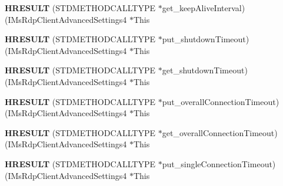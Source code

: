 \begin{DoxyCompactItemize}
\item 
\mbox{\label{struct_i_ms_rdp_client_advanced_settings4_vtbl_a57f37bf6c902b632d2842cdca290e2e7}} 
{\bfseries H\+R\+E\+S\+U\+LT} (S\+T\+D\+M\+E\+T\+H\+O\+D\+C\+A\+L\+L\+T\+Y\+PE $\ast$get\+\_\+keep\+Alive\+Interval)(I\+Ms\+Rdp\+Client\+Advanced\+Settings4 $\ast$This
\item 
\mbox{\label{struct_i_ms_rdp_client_advanced_settings4_vtbl_ae3d28b75d0776d9c0afe55852380e42c}} 
{\bfseries H\+R\+E\+S\+U\+LT} (S\+T\+D\+M\+E\+T\+H\+O\+D\+C\+A\+L\+L\+T\+Y\+PE $\ast$put\+\_\+shutdown\+Timeout)(I\+Ms\+Rdp\+Client\+Advanced\+Settings4 $\ast$This
\item 
\mbox{\label{struct_i_ms_rdp_client_advanced_settings4_vtbl_a1c4b92a5d56e238656e94f7db2dd317e}} 
{\bfseries H\+R\+E\+S\+U\+LT} (S\+T\+D\+M\+E\+T\+H\+O\+D\+C\+A\+L\+L\+T\+Y\+PE $\ast$get\+\_\+shutdown\+Timeout)(I\+Ms\+Rdp\+Client\+Advanced\+Settings4 $\ast$This
\item 
\mbox{\label{struct_i_ms_rdp_client_advanced_settings4_vtbl_a39a2de81744bcd36a349dc515b3d1c84}} 
{\bfseries H\+R\+E\+S\+U\+LT} (S\+T\+D\+M\+E\+T\+H\+O\+D\+C\+A\+L\+L\+T\+Y\+PE $\ast$put\+\_\+overall\+Connection\+Timeout)(I\+Ms\+Rdp\+Client\+Advanced\+Settings4 $\ast$This
\item 
\mbox{\label{struct_i_ms_rdp_client_advanced_settings4_vtbl_acfad6c2503ce783a26f02be98c99d20f}} 
{\bfseries H\+R\+E\+S\+U\+LT} (S\+T\+D\+M\+E\+T\+H\+O\+D\+C\+A\+L\+L\+T\+Y\+PE $\ast$get\+\_\+overall\+Connection\+Timeout)(I\+Ms\+Rdp\+Client\+Advanced\+Settings4 $\ast$This
\item 
\mbox{\label{struct_i_ms_rdp_client_advanced_settings4_vtbl_adcf340415b70b44eb49782f181e4cfd7}} 
{\bfseries H\+R\+E\+S\+U\+LT} (S\+T\+D\+M\+E\+T\+H\+O\+D\+C\+A\+L\+L\+T\+Y\+PE $\ast$put\+\_\+single\+Connection\+Timeout)(I\+Ms\+Rdp\+Client\+Advanced\+Settings4 $\ast$This
\item 
\mbox{\label{struct_i_ms_rdp_client_advanced_settings4_vtbl_a657e9bee20ff35bd0ac53c00f4cabdb5}} 

\end{DoxyCompactItemize}
